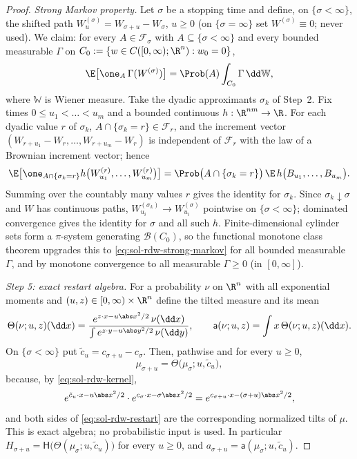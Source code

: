 \documentclass[../main.tex]{subfiles}
\begin{document}
\begin{proof}
\emph{Strong Markov property.}  Let $\sigma$ be a stopping time and define, on
$\{\sigma<\infty\}$, the shifted path $W^{(\sigma)}_u=W_{\sigma+u}-W_\sigma$, $u\ge0$
(on $\{\sigma=\infty\}$ set $W^{(\sigma)}\equiv0$; never used).  We claim: for every
$A\in\mathcal F_\sigma$ with $A\subseteq\{\sigma<\infty\}$ and every bounded measurable
$\Gamma$ on $C_0:=\{w\in C([0,\infty);\R^n):w_0=0\}$,
\begin{equation}
  \E\bigl[\one_A\,\Gamma(W^{(\sigma)})\bigr]
  =\Prob(A)\int_{C_0}\Gamma\,\dd\mathbb W,
  \label{eq:sol-rdw-strong-markov}
\end{equation}
where $\mathbb W$ is Wiener measure.  Take the dyadic approximants $\sigma_k$ of
Step~2.  Fix times $0\le u_1<\dots<u_m$ and a bounded continuous
$h:\R^{nm}\to\R$.  For each dyadic value $r$ of $\sigma_k$,
$A\cap\{\sigma_k=r\}\in\mathcal F_r$, and the increment vector
$(W_{r+u_1}-W_r,\dots,W_{r+u_m}-W_r)$ is independent of $\mathcal F_r$ with the law of
a Brownian increment vector; hence
\[
  \E\bigl[\one_{A\cap\{\sigma_k=r\}}h\bigl(W^{(r)}_{u_1},\dots,W^{(r)}_{u_m}\bigr)\bigr]
  =\Prob\bigl(A\cap\{\sigma_k=r\}\bigr)\,\E\,h\bigl(B_{u_1},\dots,B_{u_m}\bigr).
\]
Summing over the countably many values $r$ gives the identity for $\sigma_k$.  Since
$\sigma_k\downarrow\sigma$ and $W$ has continuous paths,
$W^{(\sigma_k)}_{u_i}\to W^{(\sigma)}_{u_i}$ pointwise on $\{\sigma<\infty\}$;
dominated convergence gives the identity for $\sigma$ and all such $h$.
Finite-dimensional cylinder sets form a $\pi$-system generating
$\mathcal B(C_0)$, so the functional monotone class theorem upgrades this to
\eqref{eq:sol-rdw-strong-markov} for all bounded measurable $\Gamma$, and by monotone
convergence to all measurable $\Gamma\ge0$ (in $[0,\infty]$).

\medskip
\noindent\emph{Step 5: exact restart algebra.}
For a probability $\nu$ on $\R^n$ with all exponential moments and $(u,z)\in
[0,\infty)\times\R^n$ define the tilted measure and its mean
\[
  \Theta(\nu;u,z)(\dd x)
  =\frac{e^{z\cdot x-u\abs x^2/2}\,\nu(\dd x)}
        {\int e^{z\cdot y-u\abs y^2/2}\,\nu(\dd y)},
  \qquad
  \mathsf a(\nu;u,z)=\int x\,\Theta(\nu;u,z)(\dd x).
\]
On $\{\sigma<\infty\}$ put $\tilde c_u=c_{\sigma+u}-c_\sigma$.  Then, pathwise and for
every $u\ge0$,
\begin{equation}
  \mu_{\sigma+u}=\Theta\bigl(\mu_\sigma;u,\tilde c_u\bigr),
  \label{eq:sol-rdw-restart}
\end{equation}
because, by \eqref{eq:sol-rdw-kernel},
\[
  e^{\tilde c_u\cdot x-u\abs x^2/2}\cdot e^{c_\sigma\cdot x-\sigma\abs x^2/2}
  =e^{c_{\sigma+u}\cdot x-(\sigma+u)\abs x^2/2},
\]
and both sides of \eqref{eq:sol-rdw-restart} are the corresponding normalized tilts of
$\mu$.  This is exact algebra; no probabilistic input is used.  In particular
$H_{\sigma+u}=\mathsf H\bigl(\Theta(\mu_\sigma;u,\tilde c_u)\bigr)$ for every
$u\ge0$, and $a_{\sigma+u}=\mathsf a(\mu_\sigma;u,\tilde c_u)$.


\end{proof}
\end{document}

